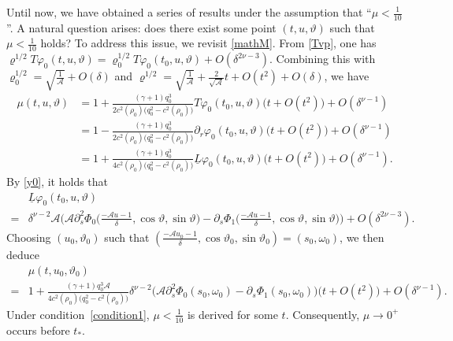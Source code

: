 \documentclass[11pt,twoside]{article}
\def\vp{\varphi}
\begin{document}
Until now, we have obtained a series of results under the assumption that ``$\mu < \frac{1}{10}$''. A natural question arises: does
there exist some point $(t, u, \vartheta)$ such that $\mu < \frac{1}{10}$ holds? To address this issue, we revisit \eqref{mathM}.
From \eqref{Tvp}, one has $\varrho^{1/2}T\vp_0(t,u,\vartheta) = \varrho_0^{1/2}T\vp_0(t_0,u,\vartheta) + O(\delta^{2\nu-3})$.
Combining this with $\varrho_0^{1/2} = \sqrt{\frac{1}{\mathcal A}} + O(\delta)$ and $\varrho^{1/2}
= \sqrt{\frac{1}{\mathcal A}} + \frac{2}{\sqrt{\mathcal A}} t + O(t^2) + O(\delta)$, we have
\begin{equation*}
\begin{split}
\mu(t,u,\vartheta)&= 1+\frac{(\gamma+1) q_0^3}{2c^2(\rho_0)\bigl(q_0^2 - c^2(\rho_0)\bigr)} T\varphi_0(t_0,u,\vartheta)\bigl(t + O(t^2)\bigr) + O(\delta^{\nu-1}) \\
&= 1 - \frac{(\gamma+1) q_0^3}{2c^2(\rho_0)\bigl(q_0^2 - c^2(\rho_0)\bigr)} \partial_r\varphi_0(t_0,u,\vartheta)\bigl(t + O(t^2)\bigr) + O(\delta^{\nu-1})\\
&=1+\frac{(\gamma+1) q_0^3}{4c^2(\rho_0)\big(q_0^2-c^2(\rho_0)\big)}\underline{L}\varphi_0(t_0,u,\vartheta)\bigl(t+O(t^2)\bigr)+O(\delta^{\nu-1}).
\end{split}\end{equation*}
By \eqref{y0}, it holds that
\begin{equation*}
\begin{split}
&\underline{L}\varphi_0(t_0,u,\vartheta) \\
=&\delta^{\nu-2}\mathcal{A} \bigl(\mathcal{A}\partial_s^2\Phi_0\big( \frac{-\mathcal{A} u - 1}{\delta},\cos\vartheta,\sin\vartheta \big)-\partial_s\Phi_1\big( \frac{-\mathcal{A} u - 1}{\delta},\cos\vartheta,\sin\vartheta\big)\bigr)+O(\delta^{2\nu-3}).
\end{split}
\end{equation*}
Choosing $(u_0, \vartheta_0)$ such that $\left( \frac{-\mathcal A u_0 - 1}{\delta}, \cos\vartheta_0, \sin\vartheta_0 \right) = (s_0, \omega_0)$, we then deduce
\begin{equation}\label{YHCC-2}
\begin{split}
&\mu(t,u_0,\vartheta_0)\\
=& 1 + \frac{(\gamma+1) q_0^3\mathcal{A}}{4c^2(\rho_0)\bigl(q_0^2 - c^2(\rho_0)\bigr)} \delta^{\nu-2} \bigl(\mathcal{A}\partial_s^2\Phi_0(s_0,\omega_0)-\partial_s\Phi_1(s_0, \omega_0)\bigr)\bigl(t + O(t^2)\bigr) + O(\delta^{\nu-1}).
\end{split}
\end{equation}
Under condition~\eqref{condition1},
$\mu<\tfrac{1}{10}$ is derived for some $t$. Consequently, $\mu\to 0^{+}$ occurs before $t_{*}$.
\end{document}

